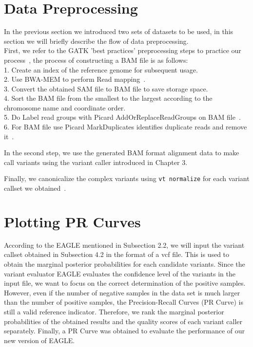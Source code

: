\documentclass[PhD]{PHlab-thesis}
\begin{document}
\section{Data Preprocessing}
In the previous section we introduced two sets of datasets to be used, in this section we will briefly describe the flow of data preprocessing.\\
First, we refer to the GATK 'best practices' preprocessing steps to practice our process~\cite{Geraldine2013GATKBestP}, the process of constructing a BAM file is as follows:\\
1. Create an index of the reference genome for subsequent usage.\\
2. Use BWA-MEM to perform Read mapping~\cite{Li2013BWA}.\\3. Convert the obtained SAM file to BAM file to save storage space.\\
4. Sort the BAM file from the smallest to the largest according to the chromosome name and coordinate order.\\
5. Do Label read groups with Picard AddOrReplaceReadGroups on BAM file~\cite{AddOrReplaceReadGroups}.\\
6. For BAM file use Picard MarkDuplicates identifies duplicate reads and remove it~\cite{MarkDuplicates}.

In the second step, we use the generated BAM format alignment data to make call variants using the variant caller introduced in Chapter 3.

Finally, we canonicalize the complex variants using \texttt{vt normalize} for each variant callset we obtained~\cite{Tan2015Vt}.

\section{Plotting PR Curves}
According to the EAGLE mentioned in Subsection 2.2, we will input the variant callset obtained in Subsection 4.2 in the format of a vcf file. This is used to obtain the marginal posterior probabilities for each candidate variants.
Since the variant evaluator EAGLE evaluates the confidence level of the variants in the input file, we want to focus on the correct determination of the positive samples.
However, even if the number of negative samples in the data set is much larger than the number of positive samples, the Precision-Recall Curves (PR Curve) is still a valid reference indicator.
Therefore, we rank the marginal posterior probabilities of the obtained results and the quality scores of each variant caller separately. Finally, a PR Curve was obtained to evaluate the performance of our new version of EAGLE.
\end{document}
